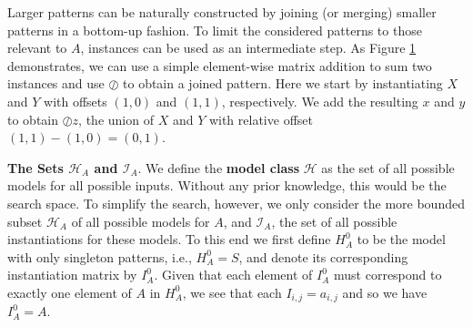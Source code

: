 \documentclass{llncs}
\begin{document}
Larger patterns can be naturally constructed by joining (or merging) smaller patterns in a bottom-up fashion. %
To limit the considered patterns to those relevant to $A$, instances can be used as an intermediate step. As Figure \ref{example2} demonstrates, we can use a simple element-wise matrix addition to sum two instances and use $\oslash$ to obtain a joined pattern. Here we start by instantiating $X$ and $Y$ with offsets $(1,0)$ and $(1,1)$, respectively. We add the resulting ${x}$ and ${y}$ to obtain $\oslash{z}$, the union of $X$ and $Y$ with relative offset $(1,1)-(1,0)=(0,1)$. %

\begin{figure}[t]
\centering

\label{example2}
\end{figure}



\smallskip
\noindent \textbf{The Sets $\mathcal{H}_A$ and $\mathcal{I}_A$}.\label{thesetH}
We define the \textbf{model class} $\mathcal{H}$ as the set of all possible models for all possible inputs. Without any prior knowledge, this would be the search space. To simplify the search, however, we only consider the more bounded subset $\mathcal{H}_A$ of all possible models for $A$, and $\mathcal{I}_A$, the set of all possible instantiations for these models. To this end we first define $H_A^0$ to be the model with only singleton patterns, i.e., $H_A^0=S$, and denote its corresponding instantiation matrix by ${I}_A^0$. Given that each element of ${I}_A^0$ must correspond to exactly one element of $A$ in $H_A^0$, we see that each ${I}_{i,j} = a_{i,j}$ and so we have ${I}_A^0 = A$. 
\end{document}
